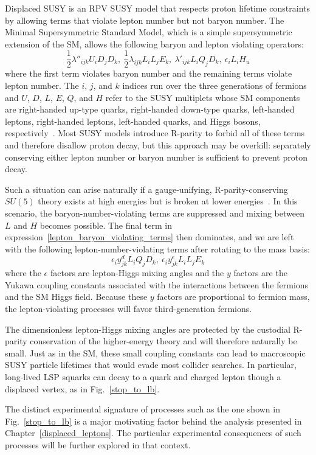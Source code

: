 Displaced SUSY is an RPV SUSY model that respects proton lifetime constraints by allowing terms that violate lepton number but not baryon number. The Minimal Supersymmetric Standard Model, which is a simple supersymmetric extension of the SM, allows the following baryon and lepton violating operators:
\begin{equation}
    \label{lepton_baryon_violating_terms}
    \frac{1}{2}\lambda''_{ijk}U_{i}D_{j}D_{k},\ \frac{1}{2}\lambda_{ijk}L_{i}L_{j}E_{k},\  \lambda'_{ijk}L_{i}Q_{j}D_{k},\  \epsilon_{i}L_{i}H_{u} 
\end{equation}
where the first term violates baryon number and the remaining terms violate lepton number. The $i$, $j$, and $k$ indices run over the three generations of fermions and $U$, $D$, $L$, $E$, $Q$, and $H$ refer to the SUSY multiplets whose SM components are right-handed up-type quarks, right-handed down-type quarks, left-handed leptons, right-handed leptons, left-handed quarks, and Higgs bosons, respectively~\cite{susy_primer}. Most SUSY models introduce R-parity to forbid all of these terms and therefore disallow proton decay, but this approach may be overkill: separately conserving either lepton number or baryon number is sufficient to prevent proton decay.

Such a situation can arise naturally if a gauge-unifying, R-parity-conserving $SU(5)$ theory exists at high energies but is broken at lower energies~\cite{hall_suzuki_rpv}. In this scenario, the baryon-number-violating terms are suppressed and mixing between $L$ and $H$ becomes possible. The final term in expression~\eqref{lepton_baryon_violating_terms} then dominates, and we are left with the following lepton-number-violating terms after rotating to the mass basis:
\begin{equation}
    \label{displaced_susy_terms}
    \epsilon_{i}y^{d}_{jk}L_{i}Q_{j}D_{k},\ \epsilon_{i}y^{e}_{jk}L_{i}L_{j}E_{k} 
\end{equation}
where the $\epsilon$ factors are lepton-Higgs mixing angles and the $y$ factors are the Yukawa coupling constants associated with the interactions between the fermions and the SM Higgs field. Because these $y$ factors are proportional to fermion mass, the lepton-violating processes will favor third-generation fermions.

The dimensionless lepton-Higgs mixing angles are protected by the custodial R-parity conservation of the higher-energy theory and will therefore naturally be small. Just as in the SM, these small coupling constants can lead to macroscopic SUSY particle lifetimes that would evade most collider searches. In particular, long-lived LSP squarks can decay to a quark and charged lepton though a displaced vertex, as in Fig.~\ref{stop_to_lb}.



The distinct experimental signature of processes such as the one shown in Fig.~\ref{stop_to_lb} is a major motivating factor behind the analysis presented in Chapter~\ref{displaced_leptons}. The particular experimental consequences of such processes will be further explored in that context.

\pagebreak
